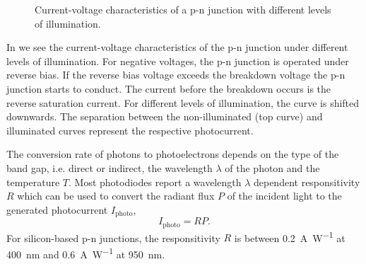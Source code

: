 \begin{figure}[H]
	\centering
	\caption{Current-voltage characteristics of a p-n junction with different levels of illumination.}\label{fig:pn_junction_iv}
\end{figure}
In  we see the current-voltage characteristics of the p-n junction under different levels of illumination.
For negative voltages, the p-n junction is operated under reverse bias.
If the reverse bias voltage exceeds the breakdown voltage the p-n junction starts to conduct.
The current before the breakdown occurs is the reverse saturation current.
For different levels of illumination, the curve is shifted downwards.
The separation between the non-illuminated (top curve) and illuminated curves represent the respective photocurrent.

The conversion rate of photons to photoelectrons depends on the type of the band gap, i.e. direct or indirect, the wavelength $\lambda$ of the photon and the temperature $T$.
Most photodiodes report a wavelength $\lambda$ dependent responsitivity $R$ which can be used to convert the radiant flux $P$ of the incident light to the generated photocurrent $I_\text{photo}$,
\begin{equation}
	I_\text{photo}=RP
	\label{eq:responsitivity}.
\end{equation}
For silicon-based p-n junctions, the responsitivity $R$ is between \SI{0.2}{\ampere\per\watt} at \SI{400}{\nano\meter} and \SI{0.6}{\ampere\per\watt} at \SI{950}{\nano\meter}.

